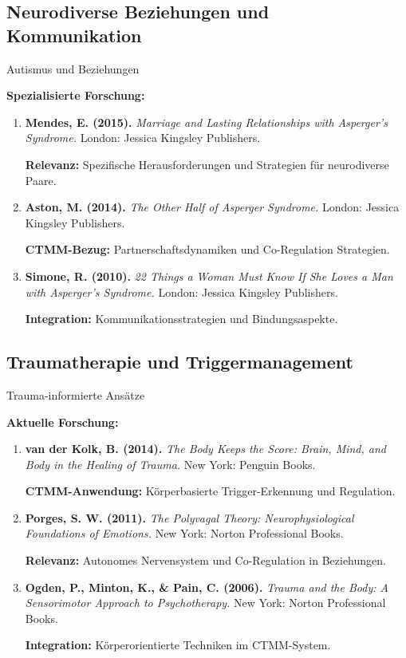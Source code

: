 \subsection{Neurodiverse Beziehungen und Kommunikation}

\begin{ctmmOrangeBox}{Autismus und Beziehungen}

\textbf{Spezialisierte Forschung:}
\begin{enumerate}
  \item \textbf{Mendes, E. (2015).} \textit{Marriage and Lasting Relationships with Asperger's Syndrome.} London: Jessica Kingsley Publishers.

  \textbf{Relevanz:} Spezifische Herausforderungen und Strategien für neurodiverse Paare.

  \item \textbf{Aston, M. (2014).} \textit{The Other Half of Asperger Syndrome.} London: Jessica Kingsley Publishers.

  \textbf{CTMM-Bezug:} Partnerschaftsdynamiken und Co-Regulation Strategien.

  \item \textbf{Simone, R. (2010).} \textit{22 Things a Woman Must Know If She Loves a Man with Asperger's Syndrome.} London: Jessica Kingsley Publishers.

  \textbf{Integration:} Kommunikationsstrategien und Bindungsaspekte.
\end{enumerate}

\end{ctmmOrangeBox}

\subsection{Traumatherapie und Triggermanagement}

\begin{ctmmPurpleBox}{Trauma-informierte Ansätze}

\textbf{Aktuelle Forschung:}
\begin{enumerate}
  \item \textbf{van der Kolk, B. (2014).} \textit{The Body Keeps the Score: Brain, Mind, and Body in the Healing of Trauma.} New York: Penguin Books.

  \textbf{CTMM-Anwendung:} Körperbasierte Trigger-Erkennung und Regulation.

  \item \textbf{Porges, S. W. (2011).} \textit{The Polyvagal Theory: Neurophysiological Foundations of Emotions.} New York: Norton Professional Books.

  \textbf{Relevanz:} Autonomes Nervensystem und Co-Regulation in Beziehungen.

  \item \textbf{Ogden, P., Minton, K., \& Pain, C. (2006).} \textit{Trauma and the Body: A Sensorimotor Approach to Psychotherapy.} New York: Norton Professional Books.

  \textbf{Integration:} Körperorientierte Techniken im CTMM-System.
\end{enumerate}

\end{ctmmPurpleBox}

